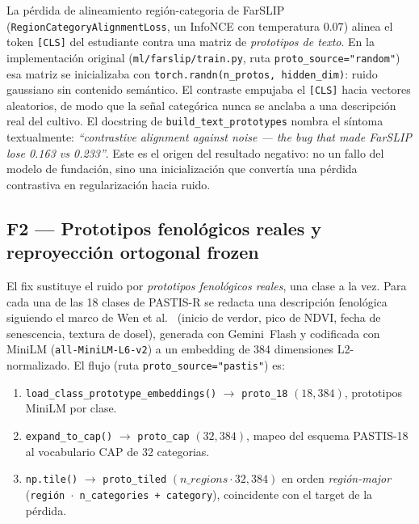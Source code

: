 La pérdida de alineamiento región-categoria de FarSLIP~\cite{li2025farslip}
(\texttt{RegionCategoryAlignmentLoss}, un InfoNCE con temperatura $0.07$) alinea
el token \texttt{[CLS]} del estudiante contra una matriz de \textit{prototipos
de texto}. En la implementación original
(\texttt{ml/farslip/train.py}, ruta \texttt{proto\_source="random"}) esa matriz
se inicializaba con \texttt{torch.randn(n\_protos, hidden\_dim)}: ruido gaussiano
sin contenido semántico. El contraste empujaba el \texttt{[CLS]} hacia vectores
aleatorios, de modo que la señal categórica nunca se anclaba a una descripción
real del cultivo. El docstring de \texttt{build\_text\_prototypes} nombra el
síntoma textualmente: \textit{``contrastive alignment against noise --- the bug
that made FarSLIP lose 0.163 vs 0.233''}. Este es el origen del resultado
negativo: no un fallo del modelo de fundación, sino una inicialización que
convertía una pérdida contrastiva en regularización hacia ruido.

\subsection{F2 --- Prototipos fenológicos reales y reproyección ortogonal frozen}
\label{sec:farslip_f2}

El fix sustituye el ruido por \textit{prototipos fenológicos reales}, una clase
a la vez. Para cada una de las 18 clases de PASTIS-R se redacta una descripción
fenológica siguiendo el marco de Wen et al.~\cite{wen2025phenology} (inicio de
verdor, pico de NDVI, fecha de senescencia, textura de dosel), generada con
Gemini~Flash y codificada con MiniLM (\texttt{all-MiniLM-L6-v2}) a un embedding
de 384 dimensiones L2-normalizado. El flujo (ruta \texttt{proto\_source="pastis"})
es:

\begin{enumerate}[leftmargin=*]
    \item \texttt{load\_class\_prototype\_embeddings()} $\rightarrow$
    \texttt{proto\_18} $(18, 384)$, prototipos MiniLM por clase.
    \item \texttt{expand\_to\_cap()} $\rightarrow$ \texttt{proto\_cap}
    $(32, 384)$, mapeo del esquema PASTIS-18 al vocabulario CAP de 32 categorias.
    \item \texttt{np.tile()} $\rightarrow$ \texttt{proto\_tiled}
    $(n\_regions \cdot 32, 384)$ en orden \textit{región-major}
    (\texttt{región $\cdot$ n\_categories + category}), coincidente con el target
    de la pérdida.
\end{enumerate}

